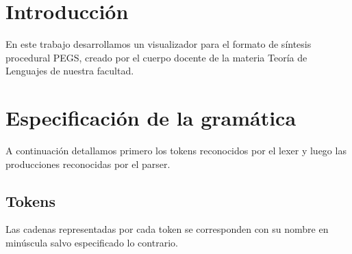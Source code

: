 \documentclass[a4paper, 10pt, twoside]{article}
\begin{document}
\newpage




\section{Introducción}

En este trabajo desarrollamos un visualizador para el formato de síntesis procedural PEGS, creado por el cuerpo docente de la materia Teoría de Lenguajes de nuestra facultad.


\section{Especificación de la gramática}

A continuación detallamos primero los tokens reconocidos por el lexer y luego las producciones reconocidas por el parser.


\subsection{Tokens}

Las cadenas representadas por cada token se corresponden con su nombre en minúscula salvo especificado lo contrario.
\end{document}
